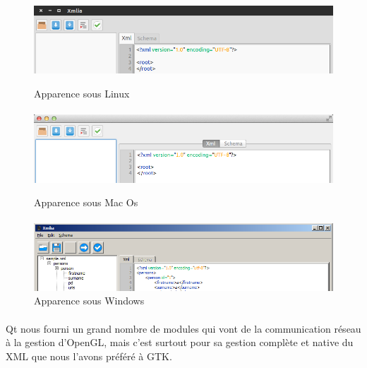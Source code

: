 \begin{figure}[h!]
\begin{minipage}[b]{\linewidth}
\centering \includegraphics[scale=0.5]{images/apparence_linux.png}
\caption{Apparence sous Linux}
\paragraph{}
\label{apparence_linux}
\end{minipage}
\begin{minipage}[b]{\linewidth}   
\centering \includegraphics[scale=0.5]{images/apparence_macos.png}
\caption{Apparence sous Mac Os}
\paragraph{}
\label{apparence_mac}
\end{minipage}
\begin{minipage}[b]{\linewidth}
\centering \includegraphics[scale=0.67]{images/apparence_windows.png}
\caption{Apparence sous Windows}
\label{apparence_windows}
\end{minipage}
\end{figure}

\paragraph{}
Qt nous fourni un grand nombre de modules qui vont de la communication réseau à la gestion d'OpenGL, mais c'est surtout pour sa gestion complète et native du XML que nous l'avons préféré à GTK.

